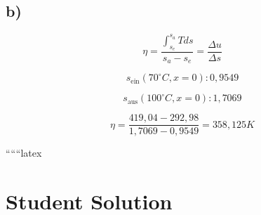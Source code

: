 

\subsection*{b)}
\[
\eta = \frac{\int_{s_e}^{s_a} T ds}{s_a - s_e} = \frac{\Delta u}{\Delta s}
\]

\[
s_{\text{ein}} (70^\circ C, x=0) : 0{,}9549
\]

\[
s_{\text{aus}} (100^\circ C, x=0) : 1{,}7069
\]

\[
\eta = \frac{419{,}04 - 292{,}98}{1{,}7069 - 0{,}9549} = 358{,}125 K
\]

``````latex


\section*{Student Solution}